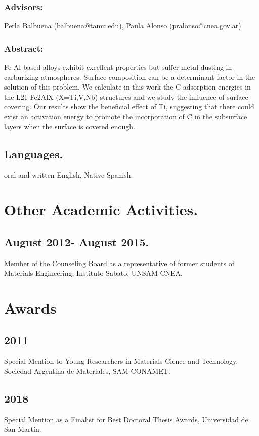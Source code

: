 \documentclass{my_cv}
\begin{document}
\subsubsection{Advisors:} Perla Balbuena (balbuena@tamu.edu), Paula Alonso (pralonso@cnea.gov.ar)
\subsubsection{Abstract:} Fe-Al based alloys exhibit excellent properties but suffer metal dusting in
carburizing atmospheres. Surface composition can be a determinant factor in the solution
of this problem. We calculate in this work the C adsorption energies in the L21 Fe2AlX
(X=Ti,V,Nb) structures and we study the influence of surface covering. Our results show
the beneficial effect of Ti, suggesting that there could exist an activation energy to promote
the incorporation of C in the subsurface layers when the surface is covered enough.
\subsection{Languages.} oral and written English, Native Spanish.

\section{Other Academic Activities.}

\subsection{August 2012- August 2015.} Member of the Counseling Board as a representative of
former students of Materials Engineering, Instituto Sabato, UNSAM-CNEA.

\section{Awards}

\subsection{2011} Special Mention to Young Researchers in Materials Cience and Technology. Sociedad
Argentina de Materiales, SAM-CONAMET.

\subsection{2018} Special Mention as a Finalist for Best Doctoral Thesis Awards, Universidad de San
Martín. 
\end{document}

